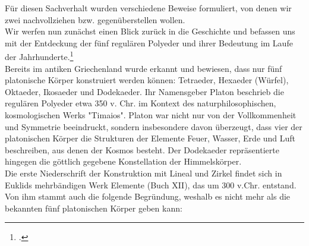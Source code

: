 Für diesen Sachverhalt wurden verschiedene Beweise formuliert, von denen wir zwei nachvollziehen bzw. gegenüberstellen wollen. \\
Wir werfen nun zunächst einen Blick zurück in die Geschichte und befassen uns mit der Entdeckung der fünf regulären Polyeder und ihrer Bedeutung im Laufe der Jahrhunderte.\footcite[Die Informationen zur Geschichte stammen von][]{Endl1993} \\
Bereits im antiken Griechenland wurde erkannt und bewiesen, dass nur fünf platonische Körper konstruiert werden können: Tetraeder, Hexaeder (Würfel), Oktaeder, Ikosaeder und Dodekaeder. Ihr Namensgeber Platon beschrieb die regulären Polyeder etwa 350 v. Chr. im Kontext des naturphilosophischen, kosmologischen Werks "Timaios". Platon war nicht nur von der Vollkommenheit und Symmetrie beeindruckt, sondern insbesondere davon überzeugt, dass vier der platonischen Körper die Strukturen der Elemente Feuer, Wasser, Erde und Luft beschreiben, aus denen der Kosmos besteht. Der Dodekaeder repräsentierte hingegen die göttlich gegebene Konstellation der Himmelskörper.\\
Die erste Niederschrift der Konstruktion mit Lineal und Zirkel findet sich in Euklids mehrbändigen Werk Elemente (Buch XII), das um 300 v.Chr. entstand. Von ihm stammt auch die folgende Begründung, weshalb es nicht mehr als die bekannten fünf platonischen Körper geben kann:
